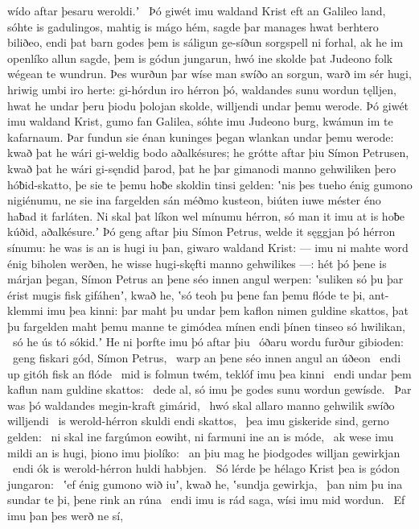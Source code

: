 wído aftar þesaru weroldi.ʼ \hld\ Þó giwét imu waldand Krist
eft an Galileo land, sóhte is gadulingos,
mahtig is mágo hém, sagde þar manages hwat
berhtero biliðeo, endi þat barn godes
þem is sáligun ge-síðun sorgspell ni forhal,
ak he im openlíko allun sagde,
þem is gódun jungarun, hwó ine skolde þat Judeono folk
wégean te wundrun. Þes wurðun þar wíse man
swíðo an sorgun, warð im sér hugi,
hriwig umbi iro herte: gi-hórdun iro hérron þó,
waldandes sunu wordun tęlljen,
hwat he undar þeru þiodu þolojan skolde,
willjendi undar þemu werode. Þó giwét imu waldand Krist,
gumo fan Galilea, sóhte imu Judeono burg,
kwámun im te kafarnaum. Þar fundun sie énan kuninges þegan
wlankan undar þemu werode: kwað þat he wári gi-weldig bodo
aðalkésures; he grótte aftar þiu
Símon Petrusen, kwað þat he wári gi-sęndid þarod,
þat he þar gimanodi manno gehwiliken
þero hóƀid-skatto, þe sie te þemu hoƀe skoldin
tinsi gelden: ʽnis þes tueho énig
gumono nigiénumu, ne sie ina fargelden sán
méðmo kusteon, biúten iuwe méster éno
haƀad it farláten. Ni skal þat líkon wel
mínumu hérron, só man it imu at is hoƀe kúðid,
aðalkésure.ʼ Þó geng aftar þiu
Símon Petrus, welde it sęggjan þó
hérron sínumu: he was is an is hugi iu þan,
giwaro waldand Krist: — imu ni mahte word énig
biholen werðen, he wisse hugi-skęfti
manno gehwilikes —: hét þó þene is márjan þegan,
Símon Petrus an þene séo innen
angul werpen: ʽsuliken só þu þar érist mugis
fisk gifáhenʼ, kwað he, ʽsó teoh þu þene fan þemu flóde te þi,
ant-klemmi imu þea kinni: þar maht þu undar þem kaflon nimen
guldine skattos, þat þu fargelden maht
þemu manne te gimódea mínen endi þínen
tinseo só hwilikan, \hld\ só he ús tó sókid.ʼ
He ni þorfte imu þó aftar þiu \hld\ óðaru wordu
furður gibioden: \hld\ geng fiskari gód,
Símon Petrus, \hld\ warp an þene séo innen
angul an úðeon \hld\ endi up gitóh
fisk an flóde \hld\ mid is folmun twém,
teklóf imu þea kinni \hld\ endi undar þem kaflun nam
guldine skattos: \hld\ dede al, só imu þe godes sunu
wordun gewísde. \hld\ Þar was þó waldandes
megin-kraft gimárid, \hld\ hwó skal allaro manno gehwilik
swíðo willjendi \hld\ is werold-hérron
skuldi endi skattos, \hld\ þea imu giskeride sind,
gerno gelden: \hld\ ni skal ine fargúmon eowiht,
ni farmuni ine an is móde, \hld\ ak wese imu mildi an is hugi,
þiono imu þiolíko: \hld\ an þiu mag he þiodgodes
willjan gewirkjan \hld\ endi ók is werold-hérron
huldi habbjen. \hld\ Só lérde þe hélago Krist
þea is gódon jungaron: \hld\ ʽef énig gumono wið iuʼ, kwað he,
ʽsundja gewirkja, \hld\ þan nim þu ina sundar te þi,
þene rink an rúna \hld\ endi imu is rád saga,
wísi imu mid wordun. \hld\ Ef imu þan þes werð ne sí,
